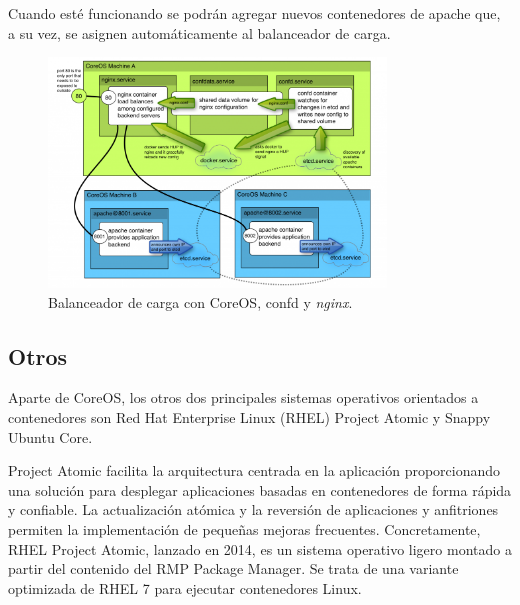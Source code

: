 Cuando esté funcionando se podrán agregar nuevos contenedores de apache que, a su vez, se asignen automáticamente al balanceador de carga.

\begin{figure}[H]
\centering
\includegraphics[width=0.8\textwidth]{images/figures/loadbalancerconfd.png}
\caption{Balanceador de carga con CoreOS, confd y \textit{nginx}.\footnotemark}
\end{figure}


\subsection{Otros}

Aparte de CoreOS, los otros dos principales sistemas operativos orientados a contenedores son  Red Hat Enterprise Linux (RHEL) Project Atomic y Snappy Ubuntu Core.

Project Atomic facilita la arquitectura centrada en la aplicación proporcionando una solución para desplegar aplicaciones basadas en contenedores de forma rápida y confiable. La actualización atómica y la reversión de aplicaciones y anfitriones permiten la implementación de pequeñas mejoras frecuentes. Concretamente, RHEL Project Atomic, lanzado en 2014, es un sistema operativo ligero montado a partir del contenido del RMP Package Manager. Se trata de una variante optimizada de RHEL 7 para ejecutar contenedores Linux.

